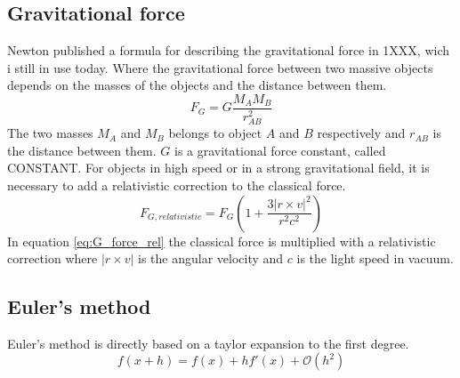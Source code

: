 \documentclass[twoside,twocolumn]{article}
\begin{document}
\subsection{Gravitational force}
Newton published a formula for describing the gravitational force in 1XXX, wich i still in use today. Where the gravitational force between two massive objects depends on the masses of the objects and the distance between them.
\begin{equation}
F_G = G\frac{M_AM_B}{r_{AB}^2} \label{eq:G_force}
\end{equation}
The two masses $M_A$ and $M_B$ belongs to object $A$ and $B$ respectively and $r_{AB}$ is the distance between them. $G$ is a gravitational force constant, called CONSTANT.
For objects in high speed or in a strong gravitational field, it is necessary to add a relativistic correction to the classical force. 
\begin{equation}
F_{G,relativistic}= F_{G}\left(1+\frac{3|r\times v|^2}{r^2c^2}\right) \label{eq:G_force_rel}
\end{equation}
In equation \ref{eq:G_force_rel} the classical force is multiplied with a relativistic correction where $|r\times v|$ is the angular velocity and $c$ is the light speed in vacuum.

\subsection{Euler's method}
Euler's method is directly based on a taylor expansion to the first degree.
\begin{equation*}
f(x+h)=f(x)+hf'(x)+\mathcal{O}(h^2)
\end{equation*}
\newpage
\end{document}
